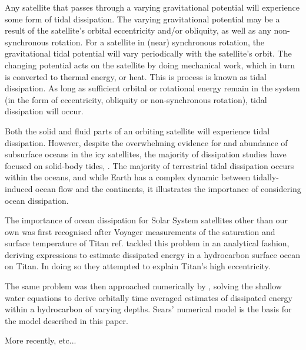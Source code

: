Any satellite that passes through a varying gravitational potential will experience some form of tidal dissipation. The varying gravitational potential may be a result of the satellite's orbital eccentricity and/or obliquity, as well as any non-synchronous rotation. For a satellite in (near) synchronous rotation, the gravitational tidal potential will vary periodically with the satellite's orbit. The changing potential acts on the satellite by doing mechanical work, which in turn is converted to thermal energy, or heat. This is process is known as tidal dissipation. As long as sufficient orbital or rotational energy remain in the system (in the form of eccentricity, obliquity or non-synchronous rotation), tidal dissipation will occur.

Both the solid and fluid parts of an orbiting satellite will experience tidal dissipation. However, despite the overwhelming evidence for and abundance of subsurface oceans in the icy satellites, the majority of dissipation studies have focused on solid-body tides, \citep[e.g.,][]{moore2000tidal, roberts2008tidal, beuthe2013spatial}. The majority of terrestrial tidal dissipation occurs within the oceans, and while Earth has a complex dynamic between tidally-induced ocean flow and the continents, it illustrates the importance of considering ocean dissipation.

The importance of ocean dissipation for Solar System satellites other than our own was first recognised after Voyager measurements of the saturation and surface temperature of Titan {ref}. \citet{sagan1982tide} tackled this problem in an analytical fashion, deriving expressions to estimate dissipated energy in a hydrocarbon surface ocean on Titan. In doing so they attempted to explain Titan's high eccentricity.

The same problem was then approached numerically by \citet{sears1995tidal}, solving the shallow water equations to derive orbitally time averaged estimates of dissipated energy within a hydrocarbon of varying depths. Sears' numerical model is the basis for the model described in this paper. 

More recently, \citet{tyler2008strong} etc... 

